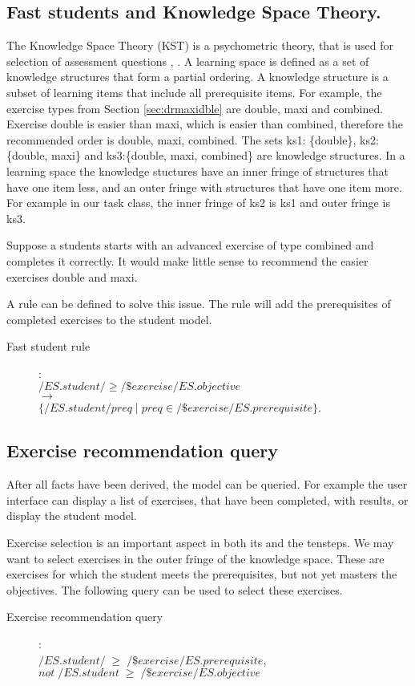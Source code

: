 \subsection{Fast students and Knowledge Space Theory.}
\label{sec:fststdntrule}
The Knowledge Space Theory (KST) is a psychometric theory, that is used for selection of assessment questions \citep{doignon_falmagne_2016}, \citep{TUGraza}.
A learning space is defined as a set of knowledge structures that form a partial ordering.
A knowledge structure is a subset of learning items that include all prerequisite items.
For example, the exercise types  from Section \ref{sec:drmaxidble} are double, maxi and combined. 
Exercise double is easier than maxi, which is easier than combined, therefore the recommended order is double, maxi, combined.
The sets ks1: \{double\}, ks2:\{double, maxi\} and ks3:\{double, maxi, combined\} are knowledge structures.
In a learning space the knowledge stuctures have an inner fringe of structures that have one item less, and an outer fringe with structures that have one item more.
For example in our task class, the inner fringe of ks2 is ks1 and outer fringe is ks3.

Suppose a students starts with an advanced exercise of type combined and completes it correctly.
It would make little sense to recommend the easier exercises double and maxi.

A rule can be defined to solve this issue.
The rule will add the prerequisites of completed exercises to the student model.
\begin{description}
\item[Fast student rule]:\\ 
$\mathit{/ES.student/ \geq /\$exercise/ES.objective}$ \\
$\rightarrow$\\
$\mathit{\{/ES.student/preq} \;| \; \mathit{preq \in /\$exercise/ES.prerequisite}\}$.
\end{description}

\subsection{Exercise recommendation query}
\label{sec:exrecquer}
After all facts have been derived, the model can be queried.
For example the user interface can display a list of exercises, that have been completed, with results, or display the student model.

Exercise selection is an important aspect in both \gls{its} and the \gls{tensteps}.
We may want to select exercises in the outer fringe of the knowledge space.
These are exercises for which the student meets the prerequisites, but not yet masters the objectives.
The following query can be used to select these exercises.

\begin{description}
\item[Exercise recommendation query]: \\
$\mathit{/ES.student/ \; \geq \;  /\$exercise/ES.prerequisite}$, \\
$\mathit{not \;  /ES.student \; \geq \;  /\$exercise/ES.objective }$\\
\end{description}



